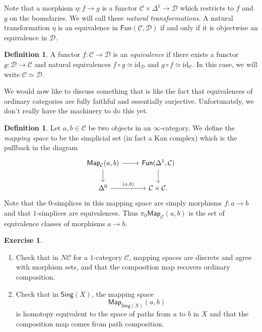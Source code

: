 \documentclass[10pt, oneside]{memoir}
\theoremstyle{definition}
\newtheorem{defn}[thm]{Definition}
\newtheorem{exer}[thm]{Exercise}
\theoremstyle{remark}
\theoremstyle{plain}
\theoremstyle{definition}
\theoremstyle{remark}
\newcommand{\mc}[1]{\mathcal{#1}}
\newcommand{\mr}[1]{\mathrm{#1}}
\newcommand{\ms}[1]{\mathsf{#1}}
\newcommand{\1}{\mathbf{1}}
\newcommand{\2}{\mathbf{2}}
\newcommand{\3}{\mathbf{3}}
\begin{document}
Note that a morphism \(\eta \colon f \to g \) is a functor \(\mc{C} \times \Delta^1 \to \mc{D} \) which restricts to \(f \) and \(g \) on the boundaries. We will call these \textit{natural transformations}. A natural transformation \(\eta \) is an equivalence in \(\ms{Fun}(\mc{C}, \mc{D}) \) if and only if it is objectwise an equivalence in \(\mc{D} \).

\begin{defn}
    A functor \(f \colon \mc{C} \to \mc{D} \) is an \textit{equivalence} if there exists a functor \(g \colon \mc{D} \to \mc{C} \) and natural equivalences \(f \circ g \simeq \mr{id}_{\mc{D}} \) and \(g \circ f \simeq \mr{id}_{\mc{C}} \). In this case, we will write \(\mc{C} \simeq \mc{D} \).
\end{defn}

We would now like to discuss something that is like the fact that equivalences of ordinary categories are fully faithful and essentially surjective. Unfortunately, we don't really have the machinery to do this yet.

\begin{defn}
    Let \(a,b \in \mc{C} \) be two objects in an \(\infty \)-category. We define the \textit{mapping space} to be the simplicial set (in fact a Kan complex) which is the pullback in the diagram
    \begin{equation*}
    \begin{tikzcd}
        \ms{Map}_{\mc{C}}(a,b) \ar{r} \ar{d} & \ms{Fun}(\Delta^1, \mc{C}) \ar{d} \\
        \Delta^0 \ar{r}{(a,b)} & \mc{C} \times \mc{C}.
    \end{tikzcd}
    \end{equation*}
    Note that the \(0 \)-simplices in this mapping space are simply morphisms \(f \colon a \to b \) and that \(1 \)-simplices are equivalences. Thus \(\pi_0 \ms{Map}_{\mc{C}}(a,b) \) is the set of equivalence classes of morphisms \(a \to b \).
\end{defn}

\begin{exer}\leavevmode
    \begin{enumerate}
        \item Check that in \(N\mc{C} \) for a \(1 \)-category \(\mc{C} \), mapping spaces are discrete and agree with morphism sets, and that the composition map recovers ordinary composition.
        \item Check that in \(\ms{Sing}(X) \), the mapping space
        \[ \ms{Map}_{\ms{Sing}(X)}(a,b) \]
        is homotopy equivalent to the space of paths from \(a \) to \(b \) in \(X \) and that the composition map comes from path composition.
    \end{enumerate}
\end{exer}
\end{document}
